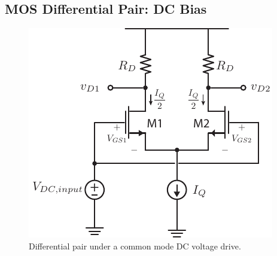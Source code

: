 \subsection{MOS Differential Pair:  DC Bias}
\begin{figure}[tb]
\begin{center}
\includegraphics[scale=1]{diffamp_cm_dc.pdf}
\end{center}
\caption{Differential pair under a common mode DC voltage drive.}
\label{fig:diffamp_cm_dc.pdf}
\end{figure}

